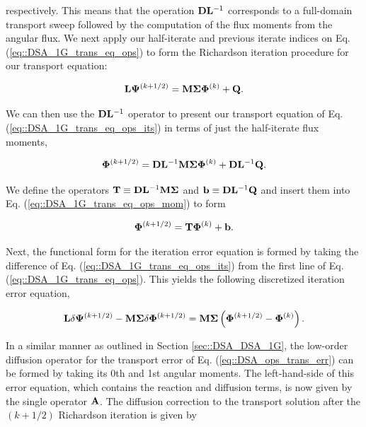 \noindent respectively. This means that the operation ${\bf D} {\bf L}^{-1}$ corresponds to a full-domain transport sweep followed by the computation of the flux moments from the angular flux. We next apply our half-iterate and previous iterate indices on Eq. (\ref{eq::DSA_1G_trans_eq_ops}) to form the Richardson iteration procedure for our transport equation:

\begin{equation}
\label{eq::DSA_1G_trans_eq_ops_its}
{\bf L} {\bf \Psi}^{(k+1/2)}= {\bf M} {\bf \Sigma} {\bf \Phi}^{(k)}  +    {\bf Q} .
\end{equation}

\noindent We can then use the ${\bf D} {\bf L}^{-1}$ operator to present our transport equation of Eq. (\ref{eq::DSA_1G_trans_eq_ops_its}) in terms of just the half-iterate flux moments,

\begin{equation}
\label{eq::DSA_1G_trans_eq_ops_mom}
 {\bf \Phi}^{(k+1/2)}  =  {\bf D} {\bf L}^{-1} {\bf M} {\bf \Sigma}  {\bf \Phi}^{(k)} +  {\bf D} {\bf L}^{-1}   {\bf Q} .
\end{equation}

\noindent We define the operators ${\bf T} \equiv {\bf D} {\bf L}^{-1} {\bf M} {\bf \Sigma}$ and ${\bf b} \equiv {\bf D} {\bf L}^{-1}   {\bf Q}$ and insert them into Eq. (\ref{eq::DSA_1G_trans_eq_ops_mom}) to form

\begin{equation}
\label{eq::DSA_1G_trans_eq_ops_mom_simple}
 {\bf \Phi}^{(k+1/2)}  = {\bf T}  {\bf \Phi}^{(k)} +  {\bf b} .
\end{equation}

\noindent Next, the functional form for the iteration error equation is formed by taking the difference of Eq. (\ref{eq::DSA_1G_trans_eq_ops_its}) from the first line of Eq. (\ref{eq::DSA_1G_trans_eq_ops}). This yields the following discretized iteration error equation,

\begin{equation}
\label{eq::DSA_ops_trans_err}
{\bf L} \delta {\bf \Psi}^{(k+1/2)} - {\bf M} {\bf \Sigma} \delta {\bf \Phi}^{(k+1/2)}  =   {\bf M} {\bf \Sigma} \left( {\bf \Phi}^{(k+1/2)} - {\bf \Phi}^{(k)}  \right) .
\end{equation}

\noindent In a similar manner as outlined in Section \ref{sec::DSA_DSA_1G}, the low-order diffusion operator for the transport error of Eq. (\ref{eq::DSA_ops_trans_err}) can be formed by taking its 0th and 1st angular moments. The left-hand-side of this error equation, which contains the reaction and diffusion terms, is now given by the single operator ${\bf A}$. The diffusion correction to the transport solution after the $(k+1/2)$ Richardson iteration is given by


